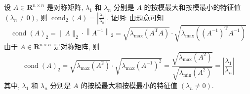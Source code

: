       \begin{tcolorbox}[enhanced,colback=blue!8!white,colframe=blue!25!white,breakable,title=2024]

设 $ A \in \mathbf{R}^{n \times n} $ 是对称矩阵, $ \lambda_{1} $ 和 $ \lambda_{n} $ 分别是 $ A $ 的按模最大和按模最小的特征值 $ \left(\lambda_{n} \neq 0\right) $, 则 $ \operatorname{cond}_{2}(A)=\left|\frac{\lambda_{1}}{\lambda_{n}}\right| $.
 \tcblower
证明: 由题意可知
$$
\operatorname{cond}(A)_{2}=\|A\|_{2} \cdot\left\|A^{-1}\right\|_{2}=\sqrt{\lambda_{\max }\left(A^{\mathrm{T}} A\right)} \cdot \sqrt{\lambda_{\max }\left(\left(A^{-1}\right)^{\mathrm{T}} A^{-1}\right)}
$$
由于 $ A \in \mathbf{R}^{n \times n} $ 是对称矩阵, 则
$$
\operatorname{cond}(A)_{2}=\sqrt{\lambda_{\max }\left(A^{2}\right)} \cdot \sqrt{\lambda_{\max }\left(A^{-1}\right)^{2}}=\frac{\sqrt{\lambda_{\max }\left(A^{2}\right)}}{\sqrt{\lambda_{\min }\left(A^{2}\right)}}=\left|\frac{\lambda_{1}}{\lambda_{n}}\right|
$$
其中, $ \lambda_{1} $ 和 $ \lambda_{n} $ 分别是 $ A $ 的按模最大和按模最小的特征值 $ \left(\lambda_{n} \neq 0\right) $.

 \end{tcolorbox}


